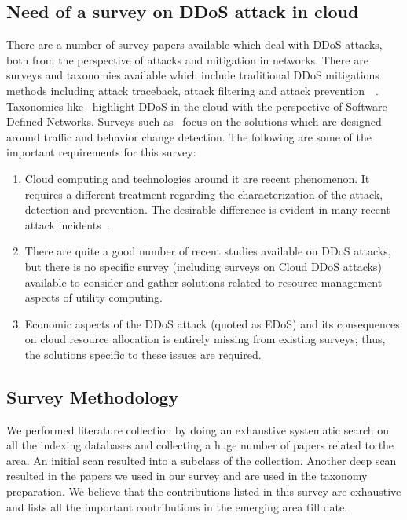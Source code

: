 \documentclass[final,5p,times,twocolumn]{elsarticle}
\begin{document}
\subsection{Need of a survey on DDoS attack in cloud}
 {There are a number of survey papers available which deal with DDoS attacks, both from the perspective of attacks and mitigation in networks. There are surveys and taxonomies available which include traditional DDoS mitigations methods including attack traceback, attack filtering and attack prevention~\cite{shui}~\cite{PengCSUR}. Taxonomies like~\cite{cloudddosSDN} highlight DDoS in the cloud with the perspective of Software Defined Networks.  Surveys such as~\cite{Osanaiye2016147} focus on the solutions which are designed around traffic and behavior change detection. The following are some of the important requirements for this survey:}
\begin{enumerate}
\item Cloud computing and technologies around it are recent phenomenon. It requires a different treatment regarding the characterization of the attack, detection and prevention. The desirable difference is evident in many recent attack incidents~\cite{cloudddosnews}.
\item There are quite a good number of recent studies available on  DDoS attacks, but there is no specific survey (including surveys on Cloud DDoS attacks) available to consider and gather solutions related to resource management aspects of utility computing. 
\item Economic aspects of the DDoS attack (quoted as EDoS) and its consequences on cloud resource allocation is entirely missing from existing surveys; thus, the solutions specific to these issues are required.
\end{enumerate}

\subsection{Survey Methodology}
\label{surveymethod}
We performed literature collection by doing an exhaustive systematic search on all the indexing databases and collecting a huge number of papers related to the area. An initial scan resulted into a subclass of the collection. Another deep scan resulted in the papers we used in our survey and are used in the taxonomy preparation. We believe that the contributions listed in this survey are exhaustive and lists all the important contributions in the emerging area till date.
 
\end{document}
